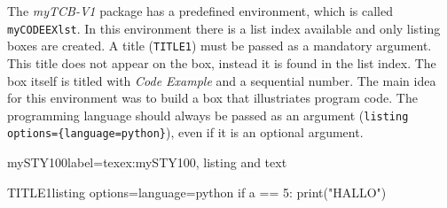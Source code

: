 \documentclass[]{myHOWTO-V001}
\begin{document}
The \emph{myTCB-V1} package has a predefined environment, which is called \Verb|myCODEEXlst|. In this environment there is a list index available and only listing boxes are created. A title (\verb|TITLE1|) must be passed as a mandatory argument. This title does not appear on the box, instead it is found in the list index. The box itself is titled with \emph{Code Example} and a sequential number. The main idea for this environment was to build a box that illustriates program code. The programming language should always be passed as an argument (\verb|listing options={language=python}|), even if it is an optional argument.

\begin{myTEXEXdoclst}{mySTY100}{label={texex:mySTY100}, listing and text}
\begin{myCODEEXlst}{TITLE1}{listing options={language=python}}
if a == 5:
	print("HALLO")
\end{myCODEEXlst}
\end{myTEXEXdoclst}
\end{document}
